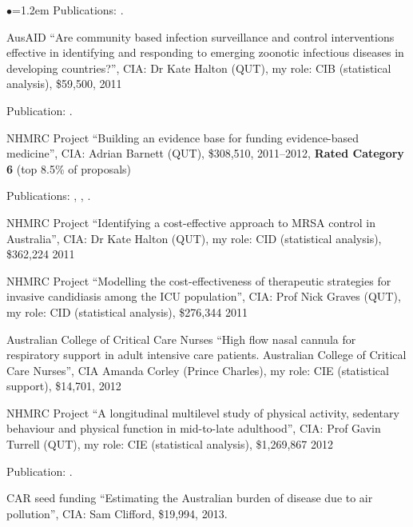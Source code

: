 \documentclass[a4paper,11pt]{article}
\renewcommand{\labelitemi}{$\bullet$}
\begin{document}
\begin{raggedright}
\begin{list}{\labelitemi}{\leftmargin=1.2em}
    Publications: .

\item AusAID ``Are community based infection surveillance and control interventions effective in identifying and responding to emerging zoonotic infectious diseases in developing countries?'', CIA: Dr Kate Halton (QUT), my role: CIB (statistical analysis), \$59,500, 2011

    Publication: .

\item NHMRC Project ``Building an evidence base for funding evidence-based medicine'', CIA: Adrian Barnett (QUT), \$308,510, 2011--2012, \textbf{Rated Category 6} (top 8.5\% of proposals)

    Publications: , , .

\item NHMRC Project ``Identifying a cost-effective approach to MRSA control in Australia'', CIA: Dr Kate Halton (QUT), my role: CID (statistical analysis), \$362,224 2011

\item NHMRC Project ``Modelling the cost-effectiveness of therapeutic strategies for invasive candidiasis among the ICU population'', CIA: Prof Nick Graves (QUT), my role: CID (statistical analysis), \$276,344 2011

\item Australian College of Critical Care Nurses ``High flow nasal cannula for respiratory support in adult intensive care patients. Australian College of Critical Care Nurses'', CIA Amanda Corley (Prince Charles), my role: CIE (statistical support), \$14,701, 2012


\item NHMRC Project ``A longitudinal multilevel study of physical activity, sedentary behaviour and physical function in mid-to-late adulthood'', CIA: Prof Gavin Turrell (QUT), my role: CIE (statistical analysis), \$1,269,867 2012

Publication: .

\item CAR seed funding ``Estimating the Australian burden of disease due to air pollution'', CIA: Sam Clifford, \$19,994, 2013.


\end{list}
\end{raggedright}
\end{document}
